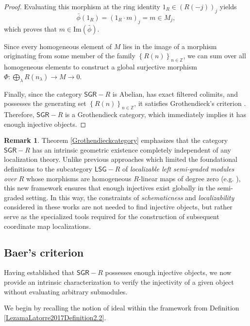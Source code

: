 \documentclass[reqno]{amsart}
\theoremstyle{definition}
\newtheorem{remark}[theorem]{Remark}
\theoremstyle{remark}
\numberwithin{equation}{section}
\begin{document}
\begin{proof}
Evaluating this morphism at the ring identity $1_R \in (R(-j))_j$ yields
\[
\bar{\phi}(1_R) = (1_R \cdot m)_j = m \in M_j,
\]
which proves that $m \in \text{Im}(\bar{\phi})$. 

Since every homogeneous element of $M$ lies in the image of a morphism originating from some member of the family $\left\{R(n)\right\}_{n \in \mathbb{Z}}$, we can sum over all homogeneous elements to construct a global surjective morphism $\Phi: \bigoplus_{\lambda} R(n_{\lambda}) \to M \to 0$. 

Finally, since the category $\mathsf{SGR}-R$ is Abelian, has exact filtered colimits, and possesses the generating set $\left\{R(n)\right\}_{n \in \mathbb{Z}}$, it satisfies Grothendieck's criterion \cite[Théorème 1.10.1]{Grothendieck1957}. Therefore, $\mathsf{SGR}-R$ is a Grothendieck category, which immediately implies it has enough injective objects.
\end{proof}

\begin{remark}
Theorem \ref{Grothendieckcategory} emphasizes that the category $\mathsf{SGR}-R$ has an intrinsic geometric existence completely independent of any localization theory. Unlike previous approaches which limited the foundational definitions to the subcategory $\mathsf{LSG}-R$ of {\em localizable left semi-graded modules over} $R$ whose morphisms are homogeneous $R$-linear maps of degree zero (e.g. \cite{ChaconPhDThesis2022, ChaconRamirezReyes2025, ChaconReyesJAA2025, ChaconReyes2025, RamirezPhDThesis2023}), this new framework ensures that enough injectives exist globally in the semi-graded setting. In this way, the constraints of {\em schematicness} and {\em localizability} considered in these works are not needed to find injective objects, but rather serve as the specialized tools required for the construction of subsequent coordinate map localizations. 
\end{remark}


\subsection{Baer's criterion}\label{Baercriterion}

Having established that $\mathsf{SGR}-R$ possesses enough injective objects, we now provide an intrinsic characterization to verify the injectivity of a given object without evaluating arbitrary submodules. 

We begin by recalling the notion of ideal within the framework from Definition \ref{LezamaLatorre2017Definition2.2}.
\end{document}
